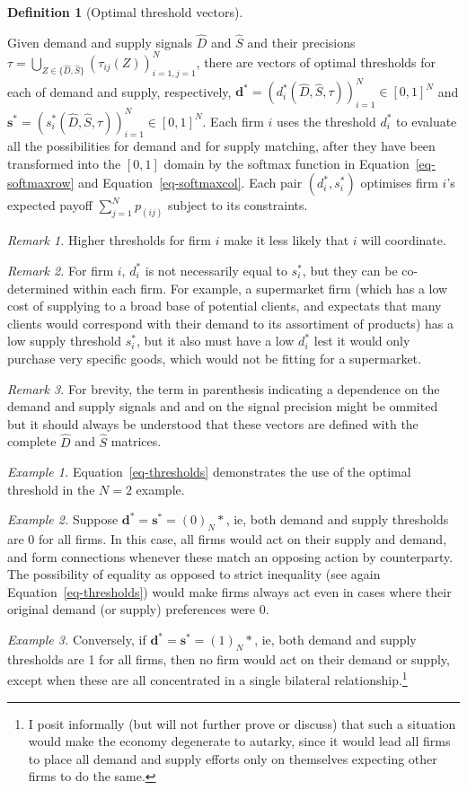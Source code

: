 \documentclass[
]{article}
\theoremstyle{definition}
\newtheorem{definition}{Definition}[section]
\theoremstyle{plain}
\theoremstyle{remark}
\begin{document}
\begin{definition}[Optimal threshold
vectors]\protect\hypertarget{def-optmthresh}{}\label{def-optmthresh}

Given demand and supply signals \(\hat{D}\) and \(\hat{S}\) and their
precisions
\(\tau = \bigcup_{Z \in \{\hat{D}, \hat{S}\}} (\tau_{ij}(Z))_{i=1, j=1}^N\),
there are vectors of optimal thresholds for each of demand and supply,
respectively,
\(\mathbf{d}^* = (d_i^*(\hat{D}, \hat{S}, \tau))_{i=1}^N \in [0, 1]^N\)
and
\(\mathbf{s}^* = (s_i^*(\hat{D}, \hat{S}, \tau))_{i=1}^N \in [0, 1]^N\).
Each firm \(i\) uses the threshold \(d_i^*\) to evaluate all the
possibilities for demand and for supply matching, after they have been
transformed into the \([0, 1]\) domain by the softmax function in
Equation~\ref{eq-softmaxrow} and Equation~\ref{eq-softmaxcol}. Each pair
\((d_i^*, s_i^*)\) optimises firm \(i\)'s expected payoff
\(\sum_{j=1}^N p_(ij)\) subject to its constraints.

\emph{Remark 1.} Higher thresholds for firm \(i\) make it less likely
that \(i\) will coordinate.

\emph{Remark 2.} For firm \(i\), \(d_i^*\) is not necessarily equal to
\(s_i^*\), but they can be co-determined within each firm. For example,
a supermarket firm (which has a low cost of supplying to a broad base of
potential clients, and expectats that many clients would correspond with
their demand to its assortiment of products) has a low supply threshold
\(s_i^*\), but it also must have a low \(d_i^*\) lest it would only
purchase very specific goods, which would not be fitting for a
supermarket.

\emph{Remark 3.} For brevity, the term in parenthesis indicating a
dependence on the demand and supply signals and and on the signal
precision might be ommited but it should always be understood that these
vectors are defined with the complete \(\hat{D}\) and \(\hat{S}\)
matrices.

\emph{Example 1.} Equation~\ref{eq-thresholds} demonstrates the use of
the optimal threshold in the \(N=2\) example.

\emph{Example 2.} Suppose
\(\mathbf{d}^{*} = \mathbf{s}^{*} = (0)_{N}*\), ie, both demand and
supply thresholds are 0 for all firms. In this case, all firms would act
on their supply and demand, and form connections whenever these match an
opposing action by counterparty. The possibility of equality as opposed
to strict inequality (see again Equation~\ref{eq-thresholds}) would make
firms always act even in cases where their original demand (or supply)
preferences were \(0\).

\emph{Example 3.} Conversely, if
\(\mathbf{d}^* = \mathbf{s}^* = (1)_N*\), ie, both demand and supply
thresholds are 1 for all firms, then no firm would act on their demand
or supply, except when these are all concentrated in a single bilateral
relationship.\footnote{I posit informally (but will not further prove or
  discuss) that such a situation would make the economy degenerate to
  autarky, since it would lead all firms to place all demand and supply
  efforts only on themselves expecting other firms to do the same.}

\end{definition}
\end{document}

